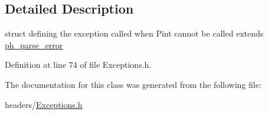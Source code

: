 \subsection{Detailed Description}
struct defining the exception called when Pint cannot be called extends \hyperlink{structph__parse__error}{ph\+\_\+parse\+\_\+error} 

Definition at line 74 of file Exceptions.\+h.



The documentation for this class was generated from the following file\+:\begin{DoxyCompactItemize}
\item 
headers/\hyperlink{Exceptions_8h}{Exceptions.\+h}\end{DoxyCompactItemize}
